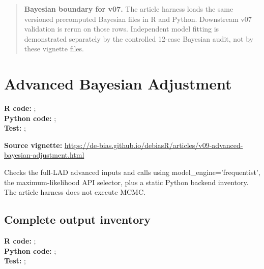 \documentclass[10pt]{article}
\newenvironment{boundarybox}
  {\begin{quote}\color{blue!55!black}}
  {\end{quote}}
\begin{document}
\begin{boundarybox}
\textbf{Bayesian boundary for v07.} The article harness
loads the same versioned precomputed Bayesian files in R and Python. Downstream
v07 validation is rerun on those rows. Independent model fitting is demonstrated
separately by the controlled 12-case Bayesian audit, not by these vignette files.
\end{boundarybox}

\section{Advanced Bayesian Adjustment}
{\footnotesize \textbf{R code:} ; \\ \textbf{Python code:} ; \\ \textbf{Test:} ; \par}


\textbf{Source vignette:} \url{https://de-bias.github.io/debiasR/articles/v09-advanced-bayesian-adjustment.html}



Checks the full-LAD advanced inputs and calls using model\_engine='frequentist', the maximum-likelihood API selector, plus a static Python backend inventory. The article harness does not execute MCMC.



\subsection{Complete output inventory}
{\footnotesize \textbf{R code:} ; \\ \textbf{Python code:} ; \\ \textbf{Test:} ; \par}
\end{document}
